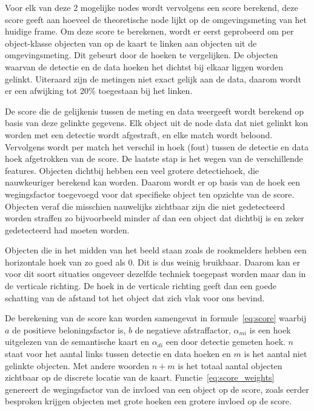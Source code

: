 Voor elk van deze 2 mogelijke nodes wordt vervolgens een score berekend, deze score geeft aan hoeveel de theoretische node lijkt op de omgevingsmeting van het huidige frame.
Om deze score te berekenen, wordt er eerst geprobeerd om per object-klasse objecten van op de kaart te linken aan objecten uit de omgevingsmeting.
Dit gebeurt door de hoeken te vergelijken.
De objecten waarvan de detectie en de data hoeken het dichtst bij elkaar liggen worden gelinkt.
Uiteraard zijn de metingen niet exact gelijk aan de data, daarom wordt er een afwijking tot 20\% toegestaan bij het linken.

De score die de gelijkenis tussen de meting en data weergeeft wordt berekend op basis van deze gelinkte gegevens.
Elk object uit de node data dat niet gelinkt kon worden met een detectie wordt afgestraft, en elke match wordt beloond.
Vervolgens wordt per match het verschil in hoek (fout) tussen de detectie en data hoek afgetrokken van de score.
De laatste stap is het wegen van de verschillende features. Objecten dichtbij hebben een veel grotere detectiehoek, die nauwkeuriger berekend kan worden.
Daarom wordt er op basis van de hoek een wegingsfactor toegevoegd voor dat specifieke object ten opzichte van de score.
Objecten veraf die misschien nauwelijks zichtbaar zijn die niet gedetecteerd worden straffen zo bijvoorbeeld minder af dan een object dat dichtbij is en zeker gedetecteerd had moeten worden.

Objecten die in het midden van het beeld staan zoals de rookmelders hebben een horizontale hoek van zo goed als 0.
Dit is dus weinig bruikbaar.
Daarom kan er voor dit soort situaties ongeveer dezelfde techniek toegepast worden maar dan in de verticale richting.
De hoek in de verticale richting geeft dan een goede schatting van de afstand tot het object dat zich vlak voor ons bevind.

De berekening van de score kan worden samengevat in formule~\ref{eq:score} waarbij $a$ de positieve beloningsfactor is, $b$ de negatieve afstraffactor,
$\alpha_{mi}$ is een hoek uitgelezen van de semantische kaart en $\alpha_{di}$ een door detectie gemeten hoek.
$n$ staat voor het aantal links tussen detectie en data hoeken en $m$ is het aantal niet gelinkte objecten.
Met andere woorden $n + m$ is het totaal aantal objecten zichtbaar op de discrete locatie van de kaart.
Functie~\ref{eq:score_weights} genereert de wegingsfactor van de invloed van een object op de score, zoals eerder besproken krijgen objecten met grote hoeken
een grotere invloed op de score.

